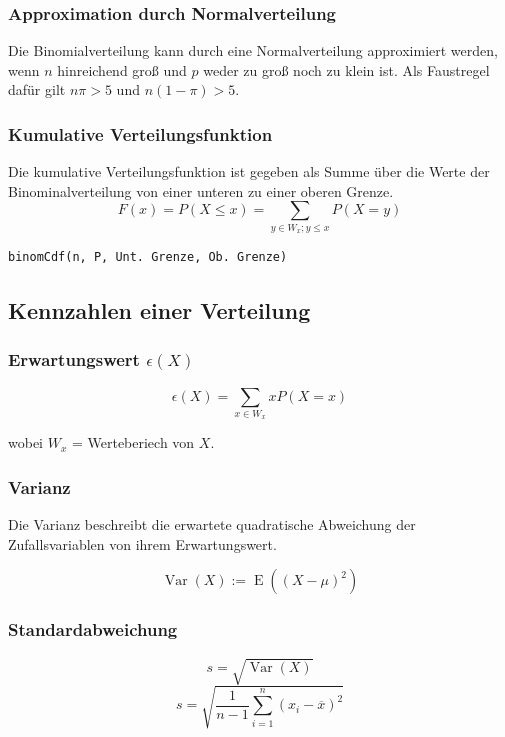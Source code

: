 \documentclass{article}
\begin{document}
\begin{multicols*}{3}
      \subsubsection{Approximation durch Normalverteilung}

      Die Binomialverteilung kann durch eine Normalverteilung approximiert werden,
      wenn $n$ hinreichend groß und $p$ weder zu groß noch zu klein ist.
      Als Faustregel dafür gilt $n \pi > 5$ und $n(1 - \pi) > 5$.

      \subsubsection{Kumulative Verteilungsfunktion}

      Die kumulative Verteilungsfunktion ist gegeben als Summe über die Werte der Binominalverteilung von einer unteren zu einer oberen Grenze.
      $$F(x) = P(X\leq x) = \sum_{y\in W_x;y\leq x}{P(X=y)}$$

      \begin{Verbatim}[frame=single]
binomCdf(n, P, Unt. Grenze, Ob. Grenze)
      \end{Verbatim}

    \subsection{Kennzahlen einer Verteilung}
      \subsubsection{Erwartungswert $\epsilon (X)$}
      $$\epsilon (X) = \sum_{x \in W_x}{xP(X=x)}$$

      wobei $W_x$ = Werteberiech von $X$.



      \subsubsection{Varianz}

      Die Varianz beschreibt die erwartete quadratische Abweichung der Zufallsvariablen von ihrem Erwartungswert.

      $$\operatorname {Var}(X):=\operatorname {E}\left((X-\mu )^{2}\right)$$

      \subsubsection{Standardabweichung}
      $$ s = \sqrt{\operatorname {Var}(X)}$$
      $${\displaystyle s={\sqrt {{\frac {1}{n-1}}\sum \limits _{i=1}^{n}\left(x_{i}-{\overline {x}}\right)^{2}}}}$$


\end{multicols*}
\end{document}
